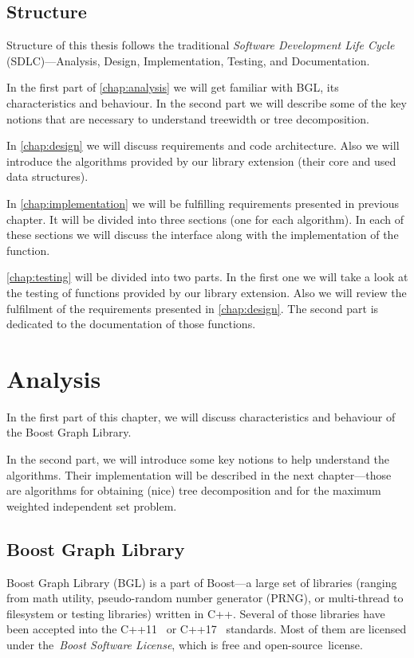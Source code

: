 \documentclass[thesis=B,english]{FITthesis}[2019/03/21]
\begin{document}
\section{Structure}
Structure of this thesis follows the traditional \emph{Software Development Life Cycle} (SDLC)---Analysis, Design, Implementation, Testing, and Documentation.

In the first part of \autoref{chap:analysis} we will get familiar with BGL, its characteristics and behaviour. In the second part we will describe some of the key notions that are necessary to understand treewidth or tree decomposition.

In \autoref{chap:design} we will discuss requirements and code architecture. Also we will introduce the algorithms provided by our library extension (their core and used data structures).

In \autoref{chap:implementation} we will be fulfilling requirements presented in previous chapter. It  will  be  divided  into  three  sections  (one for  each algorithm). In each of these sections we will discuss the interface along with the implementation of the function.

\autoref{chap:testing} will be divided into two parts. In the first one we will take a look at the testing of functions provided by our library extension. Also we will review the fulfilment of the requirements presented in \autoref{chap:design}. The second part is dedicated to the documentation of those functions.

\chapter{Analysis}\label{chap:analysis}
In the first part of this chapter, we will discuss characteristics and behaviour of the Boost Graph Library.

In the second part, we will introduce some key notions to help understand the algorithms. Their implementation will be described in the next chapter---those are algorithms for obtaining (nice) tree decomposition and for the maximum weighted independent set problem.

\section{Boost Graph Library}
Boost Graph Library (BGL) is a part of Boost---a large set of libraries (ranging from math utility, pseudo-random number generator (PRNG), or multi-thread to filesystem or testing libraries) written in C++. Several of those libraries have been accepted into the C++11~\cite{cpp_11} or C++17~\cite{cpp_17} standards. Most of them are licensed under the~\emph{Boost Software License}, which is free and open-source~license.
\end{document}
